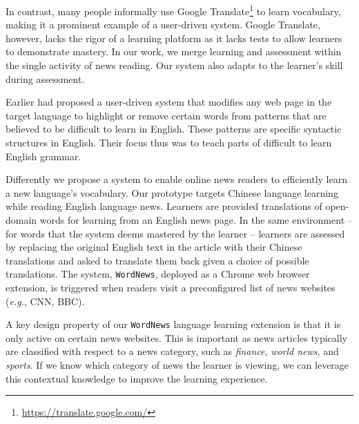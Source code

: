 In contrast, many people informally use Google
Translate\footnote{\url{https://translate.google.com/}} to learn
vocabulary, making it a prominent example of a user-driven system.
Google Translate, however, lacks the rigor of a learning platform as it lacks
tests to allow learners to demonstrate mastery.  In our work, we merge
learning and assessment within the single activity of news reading.
Our system also adapts to the learner's skill during assessment.

Earlier \cite{meurers2010} had proposed a user-driven system that modifies 
any web page in the target language to highlight or remove certain words 
from patterns that are believed to be difficult to learn in English. These 
patterns are specific syntactic structures in English. Their focus thus was 
to teach parts of difficult to learn English grammar. 

Differently we propose a system to enable online news readers to efficiently 
learn a new language's vocabulary. Our prototype targets Chinese language 
learning while reading English language news. Learners are provided translations 
of open-domain words for learning from an English news page. In the same
environment -- for words that the system deems mastered by the learner
-- learners are assessed by replacing the original English text in the
article with their Chinese translations and asked to translate them
back given a choice of possible translations.  The system, {\tt WordNews}, 
deployed as a Chrome web browser extension, is triggered when readers visit a
preconfigured list of news websites ({\it e.g.}, CNN, BBC).

A key design property of our {\tt WordNews} language learning extension  is that it is only
active on certain news websites.  This is important as news articles
typically are classified with respect to a news category, such as {\it
  finance}, {\it world news}, and {\it sports}. If we know which
category of news the learner is viewing, we can leverage this
contextual knowledge to improve the learning experience.


